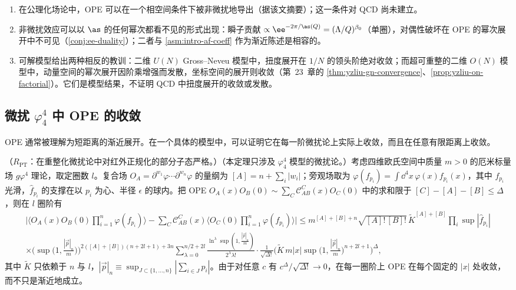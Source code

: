 \begin{remark}[非微扰地位]
\begin{enumerate}[label=(\roman*),leftmargin=1.8em,itemsep=2pt,topsep=2pt]
\item 在公理化场论中，OPE 可以在一个相空间条件下被非微扰地导出\cite{Bostelmann:2005rr}（据该文摘要）；这一条件对 QCD 尚未建立。
\item 非微扰效应可以以 $\as$ 的任何幂次都看不见的形式出现：瞬子贡献 $\propto\ee^{-2\pi/\as(Q)}=(\Lambda/Q)^{\beta_0}$（单圈），对偶性破坏在 OPE 的幂次展开中不可见（\cref{conj:ee-duality}）；二者与 \cref{asm:intro-af-coeff} 作为渐近陈述是相容的。
\item 可解模型给出两种相反的教训：二维 $U(N)$ Gross--Neveu 模型中，扭度展开在 $1/N$ 的领头阶绝对收敛；而超可重整的二维 $O(N)$ 模型中，动量空间的幂次展开因阶乘增强而发散，坐标空间的展开则收敛（第~23~章的 \cref{thm:yzliu-gn-convergence}、\cref{prop:yzliu-on-factorial}）。它们是模型结果，不证明 QCD 中扭度展开的收敛或发散。
\end{enumerate}
\end{remark}

\subsection{微扰 \texorpdfstring{$\varphi^4_4$}{phi4} 中 OPE 的收敛}

OPE 通常被理解为短距离的渐近展开。在一个具体的模型中，可以证明它在每一阶微扰论上实际上收敛，而且在任意有限距离上收敛。

\begin{theorem}\label{thm:power-ope-convergence}
（$R_{\mathrm{PT}}$：在重整化微扰论中对红外正规化的部分子态严格。）（本定理只涉及 $\varphi^4_4$ 模型的微扰论。）考虑四维欧氏空间中质量 $m>0$ 的厄米标量场 $g\varphi^4$ 理论，取定圈数 $l$。复合场 $O_A=\partial^{w_1}\varphi\cdots\partial^{w_n}\varphi$ 的量纲为 $[A]=n+\sum_i|w_i|$；旁观场取为 $\varphi(f_{p_i})=\int\dd^4x\,\varphi(x)f_{p_i}(x)$，其中 $f_{p_i}$ 光滑，$\hat f_{p_i}$ 的支撑在以 $p_i$ 为心、半径 $\epsilon$ 的球内。把 OPE $O_A(x)O_B(0)\sim\sum_C\mathcal C^C_{AB}(x)O_C(0)$ 中的求和限于 $[C]-[A]-[B]\le\Delta$，则在 $l$ 圈阶有
\begin{multline}\label{eq:power-hk}
\Big|\Big\langle O_A(x)O_B(0)\prod_{i=1}^n\varphi(f_{p_i})\Big\rangle-\sum_C\mathcal C^C_{AB}(x)\Big\langle O_C(0)\prod_{i=1}^n\varphi(f_{p_i})\Big\rangle\Big|
\le m^{[A]+[B]+n}\sqrt{[A]!\,[B]!}\,\tilde K^{[A]+[B]}\prod_i\sup|\hat f_{p_i}|\\
\times\Big(\sup\big(1,\tfrac{|\vec p|_n}{m}\big)\Big)^{2([A]+[B])(n+2l+1)+3n}\sum_{\lambda=0}^{n/2+2l}\frac{\ln^\lambda\sup(1,\frac{|\vec p|_n}{m})}{2^\lambda\lambda!}
\cdot\frac{1}{\sqrt{\Delta!}}\Big(\tilde K\,m|x|\sup\big(1,\tfrac{|\vec p|_n}{m}\big)^{n+2l+1}\Big)^{\Delta},
\end{multline}
其中 $\tilde K$ 只依赖于 $n$ 与 $l$，$|\vec p|_n\equiv\sup_{J\subset\{1,\dots,n\}}|\sum_{i\in J}p_i|$\cite[定理~3]{Hollands:2011gf}。由于对任意 $c$ 有 $c^\Delta/\sqrt{\Delta!}\to0$，在每一圈阶上 OPE 在每个固定的 $|x|$ 处收敛，而不只是渐近地成立。
\end{theorem}

